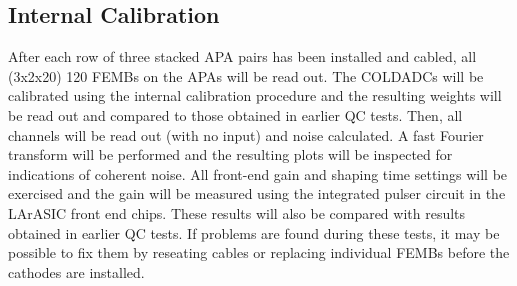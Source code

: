 \subsection{Internal Calibration}
\label{sec:fdsp-tpcelec-integration-calib}

After each row of three stacked APA pairs has been installed and cabled, all (3x2x20) 120 FEMBs on the APAs will be read out.  The COLDADCs will be calibrated using the internal calibration procedure and the resulting weights will be read out and compared to those obtained in earlier QC tests.  Then, all channels will be read out (with no input) and noise calculated.  A fast Fourier transform will be performed and the resulting plots will be inspected for indications of coherent noise.  All front-end gain and shaping time settings will be exercised and the gain will be measured using the integrated pulser circuit in the LArASIC front end chips.  These results will also be compared with results obtained in earlier QC tests.  If problems are found during these tests, it may be possible to fix them by reseating cables or replacing individual FEMBs before the cathodes are installed.
